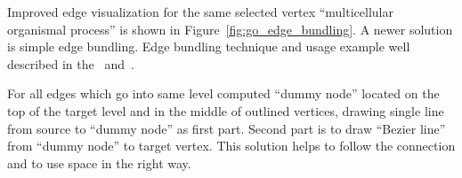 Improved edge visualization for the same selected vertex ``multicellular organismal process'' is shown in Figure~\ref{fig:go_edge_bundling}.
A newer solution is simple edge bundling. Edge bundling technique and usage example well described in the~\cite{EDGE_BUNDLING_1} and~\cite{EDGE_BUNDLING_2}.

For all edges which go into same level computed ``dummy node'' located on the top of the target level and in the middle of outlined vertices, drawing single line from source to
``dummy node'' as first part. Second part is to draw ``Bezier line'' from ``dummy node'' to target vertex. This solution helps to follow the connection and to use space in the right way.
